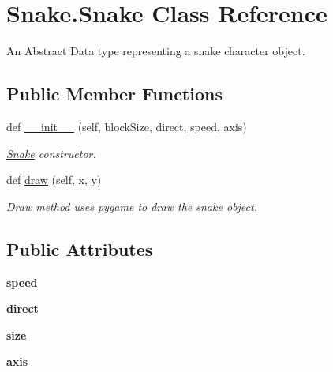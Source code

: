 \hypertarget{classSnake_1_1Snake}{}\section{Snake.\+Snake Class Reference}
\label{classSnake_1_1Snake}


An Abstract Data type representing a snake character object.  


\subsection*{Public Member Functions}
\begin{DoxyCompactItemize}
\item 
def \hyperlink{classSnake_1_1Snake_aeb38fdae78144abf6a84c7ba35af536a}{\+\_\+\+\_\+init\+\_\+\+\_\+} (self, block\+Size, direct, speed, axis)
\begin{DoxyCompactList}\small\item\em \hyperlink{classSnake_1_1Snake}{Snake} constructor. \end{DoxyCompactList}\item 
def \hyperlink{classSnake_1_1Snake_ad0507605e291c7ea3423021d4e718df3}{draw} (self, x, y)
\begin{DoxyCompactList}\small\item\em Draw method uses pygame to draw the snake object. \end{DoxyCompactList}\end{DoxyCompactItemize}
\subsection*{Public Attributes}
\begin{DoxyCompactItemize}
\item 
{\bfseries speed}\hypertarget{classSnake_1_1Snake_a0b25a63b667813d471a04e3091304ad6}{}\label{classSnake_1_1Snake_a0b25a63b667813d471a04e3091304ad6}

\item 
{\bfseries direct}\hypertarget{classSnake_1_1Snake_afb56639cdb67222e4e31ca4cfffebd2d}{}\label{classSnake_1_1Snake_afb56639cdb67222e4e31ca4cfffebd2d}

\item 
{\bfseries size}\hypertarget{classSnake_1_1Snake_a886db89c556bb8e85c462c821b56089a}{}\label{classSnake_1_1Snake_a886db89c556bb8e85c462c821b56089a}

\item 
{\bfseries axis}\hypertarget{classSnake_1_1Snake_a3ed7ae05b60f642abc4184f349ef279a}{}\label{classSnake_1_1Snake_a3ed7ae05b60f642abc4184f349ef279a}

\end{DoxyCompactItemize}


